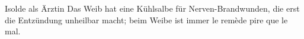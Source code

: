 Isolde als Ärztin  Das Weib hat eine Kühlsalbe für Nerven-Brandwunden, die erst die Entzündung unheilbar macht; beim Weibe ist immer le remède pire que le mal.
\par

